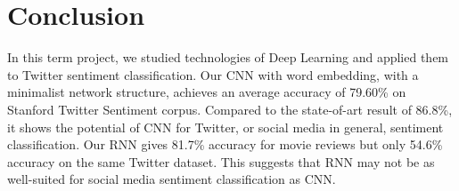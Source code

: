 \section{Conclusion}\label{sec.conclusion}

In this term project, we studied technologies of Deep Learning and applied them to Twitter sentiment classification. Our CNN with word embedding, with a minimalist network structure, achieves an average accuracy of 79.60\% on Stanford Twitter Sentiment corpus. Compared to the state-of-art result of 86.8\%, it shows the potential of CNN for Twitter, or social media in general, sentiment classification. Our RNN gives 81.7\% accuracy for movie reviews but only 54.6\% accuracy on the same Twitter dataset. This suggests that RNN may not be as well-suited for social media sentiment classification as CNN.
